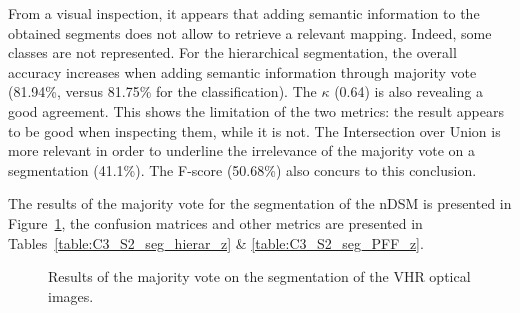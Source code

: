 From a visual inspection, it appears that adding semantic information to the obtained segments does not allow to retrieve a relevant mapping. Indeed, some classes are not represented. For the hierarchical segmentation, the overall accuracy increases when adding semantic information through majority vote (81.94\%, versus 81.75\% for the classification). The $\kappa$ (0.64) is also revealing a good agreement. This shows the limitation of the two metrics: the result appears to be good when inspecting them, while it is not. The Intersection over Union is more relevant in order to underline the irrelevance of the majority vote on a segmentation (41.1\%). The F-score (50.68\%) also concurs to this conclusion.

The results of the majority vote for the segmentation of the nDSM is presented in Figure~\ref{fig:seg_z_sem}, the confusion matrices and other metrics are presented in Tables~\ref{table:C3_S2_seg_hierar_z} \& \ref{table:C3_S2_seg_PFF_z}.

\begin{figure}[htbp]
\begin{center}
\begingroup
\captionsetup[subfigure]{width=0.3\textwidth}
\hspace*{0.025\textwidth}
\hspace*{0.025\textwidth}
\endgroup
\caption{Results of the majority vote on the segmentation of the VHR optical images.}
\label{fig:seg_z_sem}
\end{center}
\end{figure}

